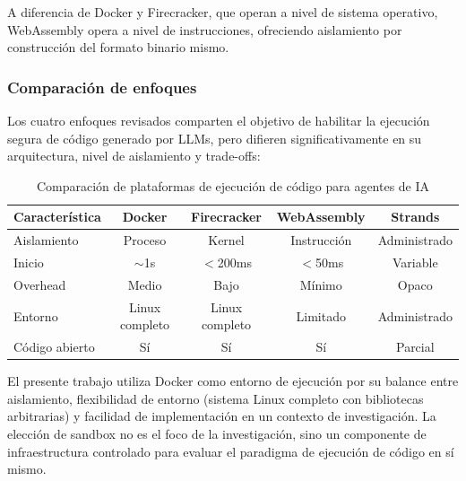 A diferencia de Docker y Firecracker, que operan a nivel de sistema operativo,
WebAssembly opera a nivel de instrucciones, ofreciendo aislamiento por
construcción del formato binario mismo.

\subsubsection{Comparación de enfoques}

Los cuatro enfoques revisados comparten el objetivo de habilitar la ejecución
segura de código generado por LLMs, pero difieren significativamente en su
arquitectura, nivel de aislamiento y trade-offs:

\begin{table}[H]
\centering
\small
\begin{tabular}{lcccc}
\toprule
\textbf{Característica} & \textbf{Docker} & \textbf{Firecracker} & \textbf{WebAssembly} & \textbf{Strands} \\
\midrule
Aislamiento & Proceso & Kernel & Instrucción & Administrado \\
Inicio & $\sim$1s & $<$200ms & $<$50ms & Variable \\
Overhead & Medio & Bajo & Mínimo & Opaco \\
Entorno & Linux completo & Linux completo & Limitado & Administrado \\
Código abierto & Sí & Sí & Sí & Parcial \\
\bottomrule
\end{tabular}
\caption{Comparación de plataformas de ejecución de código para agentes de IA}
\label{tab:sandbox-comparison}
\end{table}

El presente trabajo utiliza Docker como entorno de ejecución por su balance
entre aislamiento, flexibilidad de entorno (sistema Linux completo con
bibliotecas arbitrarias) y facilidad de implementación en un contexto de
investigación. La elección de sandbox no es el foco de la investigación, sino
un componente de infraestructura controlado para evaluar el paradigma de
ejecución de código en sí mismo.

